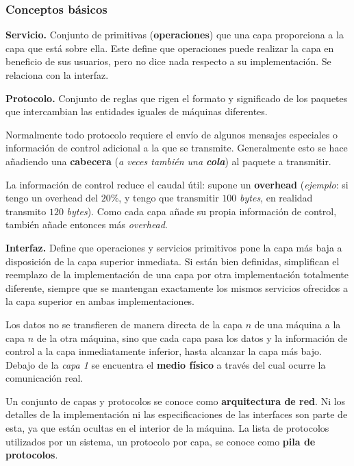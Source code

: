 \documentclass[10pt,a4paper]{article}
\begin{document}
\subsubsection{Conceptos básicos}
\begin{description}
\item \textbf{Servicio.} Conjunto de primitivas (\textbf{operaciones}) que una capa proporciona a la capa que está sobre ella. Este define que operaciones puede realizar la capa en beneficio de sus usuarios, pero no dice nada respecto a su implementación. Se relaciona con la interfaz.
\item \textbf{Protocolo.} Conjunto de reglas que rigen el formato y significado de los paquetes que intercambian las entidades iguales de máquinas diferentes.

Normalmente todo protocolo requiere el envío de algunos mensajes especiales o información de control adicional a la que se transmite. Generalmente esto se hace añadiendo una \textbf{cabecera} (\textit{a veces también una \textbf{cola}}) al paquete a transmitir.

La información de control reduce el caudal útil: supone un \textbf{overhead} (\textit{ejemplo}: si tengo un overhead del $20\%$, y tengo que transmitir $100$ \textit{bytes}, en realidad transmito $120$ \textit{bytes}). Como cada capa añade su propia información de control, también añade entonces más \textit{overhead}.

\item \textbf{Interfaz.} Define que operaciones y servicios primitivos pone la capa más baja a disposición de la capa superior inmediata. Si están bien definidas, simplifican el reemplazo de la implementación de una capa por otra implementación totalmente diferente, siempre que se mantengan exactamente los mismos servicios ofrecidos a la capa superior en ambas implementaciones.
\end{description}

Los datos no se transfieren de manera directa de la capa $n$ de una máquina a la capa $n$ de la otra máquina, sino que cada capa pasa los datos y la información de control a la capa inmediatamente inferior, hasta alcanzar la capa más bajo. Debajo de la \textit{capa 1} se encuentra el \textbf{medio físico} a través del cual ocurre la comunicación real.

Un conjunto de capas y protocolos se conoce como \textbf{arquitectura de red}. Ni los detalles de la implementación ni las especificaciones de las interfaces son parte de esta, ya que están ocultas en el interior de la máquina. La lista de protocolos utilizados por un sistema, un protocolo por capa, se conoce como \textbf{pila de protocolos}.
\end{document}
